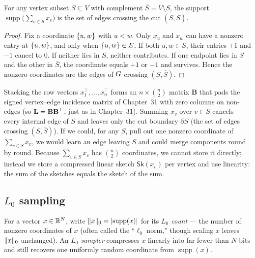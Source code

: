 \begin{lemma}\label{ch40:lem-boundary}
For any vertex subset $S\subseteq V$ with complement $\bar S = V\setminus S$,
the support $\operatorname{supp}\!\bigl(\sum_{v\in S} x_v\bigr)$ is the set of
edges crossing the cut $(S,\bar S)$.
\end{lemma}

\begin{proof}
Fix a coordinate $\{u,w\}$ with $u < w$. Only $x_u$ and $x_w$ can have a
nonzero entry at $\{u,w\}$, and only when $\{u,w\}\in E$. If both
$u,w\in S$, their entries $+1$ and $-1$ cancel to $0$. If neither lies in $S$,
neither contributes. If one endpoint lies in $S$ and the other in $\bar S$,
the coordinate equals $+1$ or $-1$ and survives. Hence the nonzero coordinates
are the edges of $G$ crossing $(S,\bar S)$.
\end{proof}

\begin{intuitionbox}
Stacking the row vectors $x_1^\top,\dots,x_n^\top$ forms an
$n\times\binom{n}{2}$ matrix $\mathbf{B}$ that pads the signed vertex--edge
incidence matrix of Chapter~31 with zero columns on non-edges (so
$\mathbf{L} = \mathbf{B}\mathbf{B}^\top$, just as in Chapter~31). Summing $x_v$ over
$v\in S$ cancels every internal edge of $S$ and leaves only the cut boundary
$\partial S$ (the set of edges crossing $(S,\bar S)$). If we could, for any
$S$, pull out one nonzero coordinate of $\sum_{v\in S} x_v$, we would learn an
edge leaving $S$ and could merge components round by round. Because
$\sum_{v\in S} x_v$ has $\binom{n}{2}$ coordinates, we cannot store it directly;
instead we store a compressed linear sketch $\mathsf{Sk}(x_v)$ per vertex and
use linearity: the sum of the sketches equals the sketch of the sum.
\end{intuitionbox}

\subsection{\texorpdfstring{$L_0$}{L0} sampling}

For a vector $x\in\mathbb{R}^N$, write $\lVert x\rVert_0 = \lvert\operatorname{supp}(x)\rvert$ for
its \emph{$L_0$ count} --- the number of nonzero coordinates of $x$ (often
called the ``$\ell_0$ norm,'' though scaling $x$ leaves $\lVert x\rVert_0$ unchanged).
An \emph{$L_0$ sampler} compresses $x$ linearly into far fewer than $N$ bits
and still recovers one uniformly random coordinate from $\operatorname{supp}(x)$.


